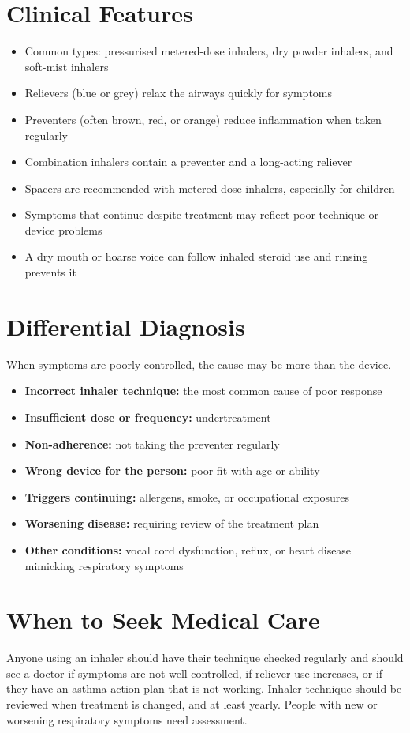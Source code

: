 \section*{Clinical Features}
\begin{itemize}
    \item Common types: pressurised metered-dose inhalers, dry powder inhalers, and soft-mist inhalers
    \item Relievers (blue or grey) relax the airways quickly for symptoms
    \item Preventers (often brown, red, or orange) reduce inflammation when taken regularly
    \item Combination inhalers contain a preventer and a long-acting reliever
    \item Spacers are recommended with metered-dose inhalers, especially for children
    \item Symptoms that continue despite treatment may reflect poor technique or device problems
    \item A dry mouth or hoarse voice can follow inhaled steroid use and rinsing prevents it
\end{itemize}

\section*{Differential Diagnosis}
When symptoms are poorly controlled, the cause may be more than the device.
\begin{itemize}
    \item \textbf{Incorrect inhaler technique:} the most common cause of poor response
    \item \textbf{Insufficient dose or frequency:} undertreatment
    \item \textbf{Non-adherence:} not taking the preventer regularly
    \item \textbf{Wrong device for the person:} poor fit with age or ability
    \item \textbf{Triggers continuing:} allergens, smoke, or occupational exposures
    \item \textbf{Worsening disease:} requiring review of the treatment plan
    \item \textbf{Other conditions:} vocal cord dysfunction, reflux, or heart disease mimicking respiratory symptoms
\end{itemize}

\section*{When to Seek Medical Care}
Anyone using an inhaler should have their technique checked regularly and should see a doctor if symptoms are not well controlled, if reliever use increases, or if they have an asthma action plan that is not working. Inhaler technique should be reviewed when treatment is changed, and at least yearly. People with new or worsening respiratory symptoms need assessment.

